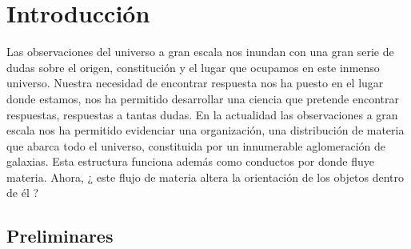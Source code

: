 



\chapter{Introducción}
\label{cha:Introduction}

Las observaciones del universo a gran escala nos inundan con una gran serie de dudas sobre el origen, constitución y el lugar que ocupamos en este inmenso universo. Nuestra necesidad de encontrar respuesta nos ha puesto en el lugar donde estamos, nos ha permitido desarrollar una ciencia que pretende encontrar respuestas, respuestas a tantas dudas. En la actualidad las observaciones a gran escala nos ha permitido evidenciar una organización, una distribución de materia que abarca todo el universo, constituida por un innumerable aglomeración de galaxias. Esta estructura  funciona además como conductos por donde fluye materia. Ahora, ¿ este flujo de materia altera la orientación de los objetos dentro de él ?
 
\section{Preliminares }
\label{sec: prelimenares}
 
